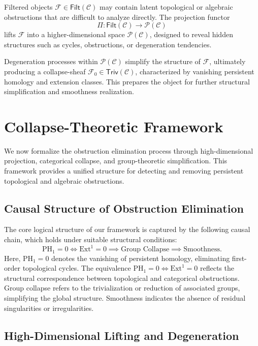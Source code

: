 \documentclass[11pt]{article}
\begin{document}
Filtered objects $\mathcal{F} \in \mathsf{Filt}(\mathcal{C})$ may contain latent topological or algebraic obstructions that are difficult to analyze directly. The projection functor
\[
\Pi : \mathsf{Filt}(\mathcal{C}) \longrightarrow \mathcal{P}(\mathcal{C})
\]
lifts $\mathcal{F}$ into a higher-dimensional space $\mathcal{P}(\mathcal{C})$, designed to reveal hidden structures such as cycles, obstructions, or degeneration tendencies.

Degeneration processes within $\mathcal{P}(\mathcal{C})$ simplify the structure of $\mathcal{F}$, ultimately producing a collapse-sheaf $\mathcal{F}_0 \in \mathsf{Triv}(\mathcal{C})$, characterized by vanishing persistent homology and extension classes. This prepares the object for further structural simplification and smoothness realization.


\section{Collapse-Theoretic Framework}

We now formalize the obstruction elimination process through high-dimensional projection, categorical collapse, and group-theoretic simplification. This framework provides a unified structure for detecting and removing persistent topological and algebraic obstructions.

\subsection{Causal Structure of Obstruction Elimination}

The core logical structure of our framework is captured by the following causal chain, which holds under suitable structural conditions:
\[
\mathrm{PH}_1 = 0 \iff \mathrm{Ext}^1 = 0 \implies \text{Group Collapse} \implies \text{Smoothness}.
\]
Here, $\mathrm{PH}_1 = 0$ denotes the vanishing of persistent homology, eliminating first-order topological cycles. The equivalence $\mathrm{PH}_1 = 0 \iff \mathrm{Ext}^1 = 0$ reflects the structural correspondence between topological and categorical obstructions. Group collapse refers to the trivialization or reduction of associated groups, simplifying the global structure. Smoothness indicates the absence of residual singularities or irregularities.

\subsection{High-Dimensional Lifting and Degeneration}
\end{document}
